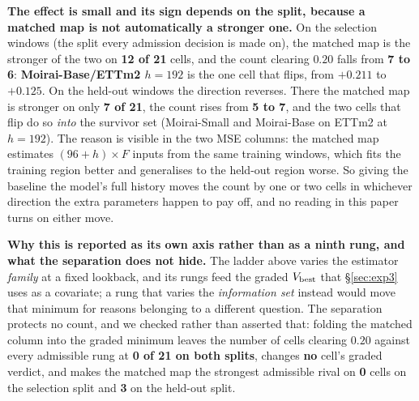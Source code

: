 \textbf{The effect is small and its sign depends on the split, because a matched
map is not automatically a stronger one.}  On the selection windows (the split
every admission decision is made on), the matched map is the stronger of the two
on \textbf{12 of 21} cells, and the count clearing $0.20$ falls from
\textbf{7 to 6}: \textbf{Moirai-Base/ETTm2 $h{=}192$} is the one cell that flips,
from $+0.211$ to $+0.125$.  On the held-out windows the direction reverses.  There
the matched map is stronger on only \textbf{7 of 21}, the count rises from
\textbf{5 to 7}, and the two cells that flip do so \emph{into} the survivor set
(Moirai-Small and Moirai-Base on ETTm2 at $h{=}192$).  The reason is visible in
the two MSE columns: the matched map estimates $(96{+}h){\times}F$ inputs from the
same training windows, which fits the training region better and generalises to
the held-out region worse.  So giving the baseline the model's full history moves
the count by one or two cells in whichever direction the extra parameters happen
to pay off, and no reading in this paper turns on either move.

\textbf{Why this is reported as its own axis rather than as a ninth rung, and what
the separation does not hide.}  The ladder above varies the estimator
\emph{family} at a fixed lookback, and its rungs feed the graded
$V_{\text{best}}$ that \S\ref{sec:exp3} uses as a covariate; a rung that
varies the \emph{information set} instead would move that minimum for reasons
belonging to a different question.  The separation protects no count, and we
checked rather than asserted that: folding the matched column into the graded
minimum leaves the number of cells clearing $0.20$ against every admissible rung
at \textbf{0 of 21 on both splits}, changes \textbf{no} cell's graded verdict, and
makes the matched map the strongest admissible rival on \textbf{0} cells on the
selection split and \textbf{3} on the held-out split.

\begin{table}[ht]
\centering
\caption{\textbf{The gate with the baseline given Moirai's full $96{+}h$ history,
on the \emph{selection} windows.}  The same fitted ridge in both columns; only how
many of the available past steps it may use differs.  MSE ratio is
$\text{MSE}_{96+h}/\text{MSE}_{96}$, so below $1$ means the extra history made the
baseline stronger.  Bold clears $0.20$.  Generated by
\texttt{scripts/matched\_lookback\_gate.py --split val}.}
\label{tab:matchedlbval}

\end{table}


